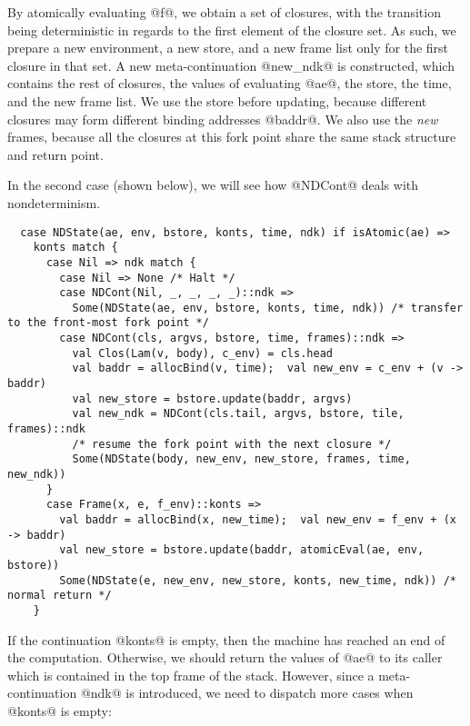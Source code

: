 \documentclass[acmsmall, screen]{acmart}\settopmatter{}
\begin{document}
By atomically evaluating @f@, we obtain a set of closures, with the transition being
deterministic in regards to the first element of the closure set.
As such, we prepare a new environment, a new store, and a new frame list only for the
first closure in that set. A new meta-continuation @new_ndk@ is constructed,
which contains the rest of closures, the values of evaluating @ae@, the store, the time,
and the new frame list. We use the store before updating, because different
closures may form different binding addresses @baddr@. We also use the \textit{new} frames,
because all the closures at this fork point share the same stack structure and return point.

In the second case (shown below), we will see how @NDCont@ deals with nondeterminism.

\begin{lstlisting}
  case NDState(ae, env, bstore, konts, time, ndk) if isAtomic(ae) =>
    konts match {
      case Nil => ndk match {
        case Nil => None /* Halt */
        case NDCont(Nil, _, _, _, _)::ndk =>
          Some(NDState(ae, env, bstore, konts, time, ndk)) /* transfer to the front-most fork point */
        case NDCont(cls, argvs, bstore, time, frames)::ndk =>
          val Clos(Lam(v, body), c_env) = cls.head
          val baddr = allocBind(v, time);  val new_env = c_env + (v -> baddr)
          val new_store = bstore.update(baddr, argvs)
          val new_ndk = NDCont(cls.tail, argvs, bstore, tile, frames)::ndk
          /* resume the fork point with the next closure */
          Some(NDState(body, new_env, new_store, frames, time, new_ndk))
      }
      case Frame(x, e, f_env)::konts =>
        val baddr = allocBind(x, new_time);  val new_env = f_env + (x -> baddr)
        val new_store = bstore.update(baddr, atomicEval(ae, env, bstore))
        Some(NDState(e, new_env, new_store, konts, new_time, ndk)) /* normal return */
    }
\end{lstlisting}

If the continuation @konts@ is empty, then the machine has reached an end of the computation.
Otherwise, we should return the values of @ae@ to its caller which is contained in the top
frame of the stack. However, since a meta-continuation @ndk@ is introduced, we need to dispatch
more cases when @konts@ is empty:
\end{document}
